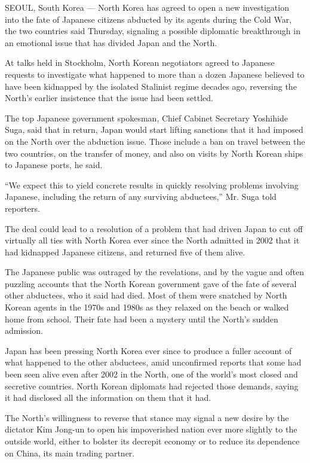 SEOUL, South Korea --- North Korea has agreed to open a new
investigation into the fate of Japanese citizens abducted by its agents
during the Cold War, the two countries said Thursday, signaling a
possible diplomatic breakthrough in an emotional issue that has divided
Japan and the North.

At talks held in Stockholm, North Korean negotiators agreed to Japanese
requests to investigate what happened to more than a dozen Japanese
believed to have been kidnapped by the isolated Stalinist regime decades
ago, reversing the North's earlier insistence that the issue had been
settled.

The top Japanese government spokesman, Chief Cabinet Secretary Yoshihide
Suga, said that in return, Japan would start lifting sanctions that it
had imposed on the North over the abduction issue. Those include a ban
on travel between the two countries, on the transfer of money, and also
on visits by North Korean ships to Japanese ports, he said.

``We expect this to yield concrete results in quickly resolving problems
involving Japanese, including the return of any surviving abductees,''
Mr. Suga told reporters.

The deal could lead to a resolution of a problem that had driven Japan
to cut off virtually all ties with North Korea ever since the North
admitted in 2002 that it had kidnapped Japanese citizens, and returned
five of them alive.

The Japanese public was outraged by the revelations, and by the vague
and often puzzling accounts that the North Korean government gave of the
fate of several other abductees, who it said had died. Most of them were
snatched by North Korean agents in the 1970s and 1980s as they relaxed
on the beach or walked home from school. Their fate had been a mystery
until the North's sudden admission.

Japan has been pressing North Korea ever since to produce a fuller
account of what happened to the other abductees, amid unconfirmed
reports that some had been seen alive even after 2002 in the North, one
of the world's most closed and secretive countries. North Korean
diplomats had rejected those demands, saying it had disclosed all the
information on them that it had.

The North's willingness to reverse that stance may signal a new desire
by the dictator Kim Jong-un to open his impoverished nation ever more
slightly to the outside world, either to bolster its decrepit economy or
to reduce its dependence on China, its main trading partner.


